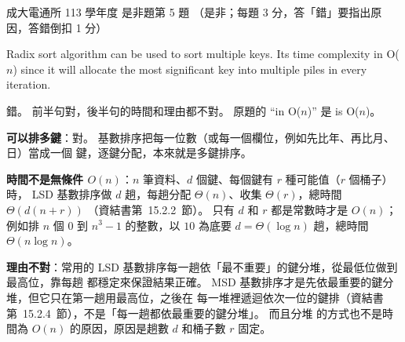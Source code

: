 \begin{pastexam}[label={px:ncku-113-cce-05}]{成大電通所 113 學年度 是非題第 5 題}
（是非；每題 3 分，答「錯」要指出原因，答錯倒扣 1 分）

Radix sort algorithm can be used to sort multiple keys. Its time complexity in O($n$) since it
will allocate the most significant key into multiple piles in every iteration.
\end{pastexam}

\begin{pastsoln}
錯。 前半句對，後半句的時間和理由都不對。 原題的 ``in O($n$)'' 是 is O($n$)。

\textbf{可以排多鍵}：對。 基數排序把每一位數（或每一個欄位，例如先比年、再比月、日）當成一個
鍵，逐鍵分配，本來就是多鍵排序。

\textbf{時間不是無條件 $O(n)$}：$n$ 筆資料、$d$ 個鍵、每個鍵有 $r$ 種可能值（$r$ 個桶子）時，
LSD 基數排序做 $d$ 趟，每趟分配 $\Theta(n)$、收集 $\Theta(r)$，總時間 $\Theta(d(n + r))$
（資結書第~15.2.2~節）。 只有 $d$ 和 $r$ 都是常數時才是 $O(n)$；例如排 $n$ 個 $0$ 到 $n^3 - 1$
的整數，以 $10$ 為底要 $d = \Theta(\log n)$ 趟，總時間 $\Theta(n \log n)$。

\textbf{理由不對}：常用的 LSD 基數排序每一趟依「最不重要」的鍵分堆，從最低位做到最高位，靠每趟
都穩定來保證結果正確。 MSD 基數排序才是先依最重要的鍵分堆，但它只在第一趟用最高位，之後在
每一堆裡遞迴依次一位的鍵排（資結書第~15.2.4~節），不是「每一趟都依最重要的鍵分堆」。 而且分堆
的方式也不是時間為 $O(n)$ 的原因，原因是趟數 $d$ 和桶子數 $r$ 固定。
\end{pastsoln}
